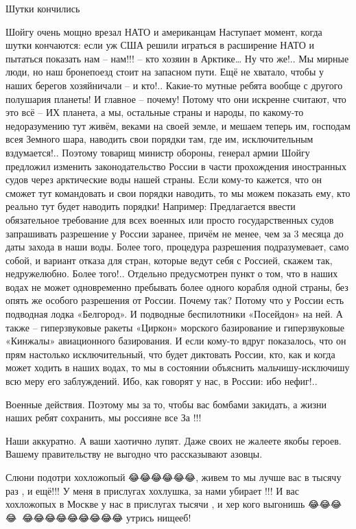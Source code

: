 Шутки кончились

Шойгу очень мощно врезал НАТО и американцам
Наступает момент, когда шутки кончаются: если уж США решили играться в расширение НАТО и пытаться показать нам – нам!!! – кто хозяин в Арктике… Ну что же!.. Мы мирные люди, но наш бронепоезд стоит на запасном пути. Ещё не хватало, чтобы у наших берегов хозяйничали – и кто!.. Какие-то мутные ребята вообще с другого полушария планеты! И главное – почему! Потому что они искренне считают, что это всё – ИХ планета, а мы, остальные страны и народы, по какому-то недоразумению тут живём, веками на своей земле, и мешаем теперь им, господам всея Земного шара, наводить свои порядки там, где им, исключительным вздумается!..
Поэтому товарищ министр обороны, генерал армии Шойгу предложил изменить законодательство России в части прохождения иностранных судов через арктические воды нашей страны. Если кому-то кажется, что он сможет тут командовать и свои порядки наводить, то мы можем показать ему, кто реально тут будет наводить порядки! Например:
Предлагается ввести обязательное требование для всех военных или просто государственных судов запрашивать разрешение у России заранее, причём не менее, чем за 3 месяца до даты захода в наши воды. Более того, процедура разрешения подразумевает, само собой, и вариант отказа для стран, которые ведут себя с Россией, скажем так, недружелюбно. Более того!..
Отдельно предусмотрен пункт о том, что в наших водах не может одновременно пребывать более одного корабля одной страны, без опять же особого разрешения от России. Почему так?
Потому что у России есть подводная лодка «Белгород». И подводные беспилотники «Посейдон» на ней. А также – гиперзвуковые ракеты «Циркон» морского базирование и гиперзвуковые «Кинжалы» авиационного базирования. И если кому-то вдруг показалось, что он прям настолько исключительный, что будет диктовать России, кто, как и когда может ходить в наших водах, то мы в состоянии объяснить мальчишу-исключишу всю меру его заблуждений. Ибо, как говорят у нас, в России: ибо нефиг!..

Военные действия. Поэтому мы за то, чтобы вас бомбами закидать, а жизни наших
ребят сохранить, мы россияне все За !!!

Наши аккуратно. А ваши хаотично лупят. Даже своих не жалеете якобы героев.
Вашему правительству не выгодно что рассказывают азовцы.

Слюни подотри хохложопый 😂😂😂😂😂😂, живем то мы лучше вас в тысячу раз , и
ещё!!! У меня в прислугах хохлушка, за нами убирает !!! И вас хохложопых в
Москве у нас в прислугах тысячи , и хер кого выгонишь
😂😂😂😂🤣🤣😂😂😂😂😂😂😂😂😂 утрись нищееб!

